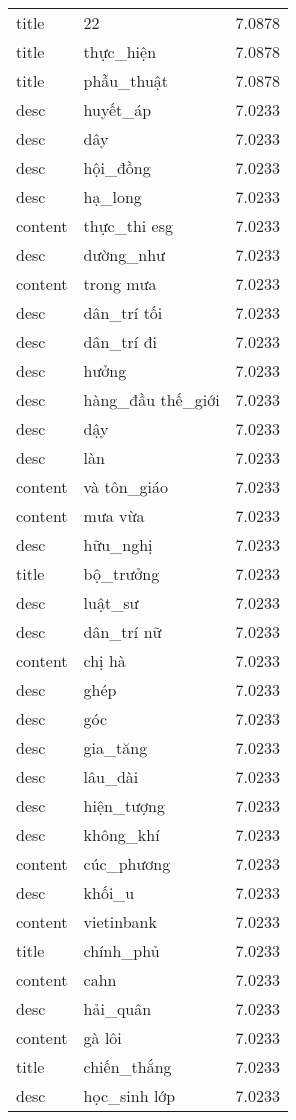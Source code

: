 \documentclass{article}
\begin{document}
\begin{tabular}{lll}
title & 22 & 7.0878\\
title & thực\_hiện & 7.0878\\
title & phẫu\_thuật & 7.0878\\
desc & huyết\_áp & 7.0233\\
desc & dây & 7.0233\\
desc & hội\_đồng & 7.0233\\
desc & hạ\_long & 7.0233\\
content & thực\_thi esg & 7.0233\\
desc & dường\_như & 7.0233\\
content & trong mưa & 7.0233\\
desc & dân\_trí tối & 7.0233\\
desc & dân\_trí đi & 7.0233\\
desc & hưởng & 7.0233\\
desc & hàng\_đầu thế\_giới & 7.0233\\
desc & dậy & 7.0233\\
desc & làn & 7.0233\\
content & và tôn\_giáo & 7.0233\\
content & mưa vừa & 7.0233\\
desc & hữu\_nghị & 7.0233\\
title & bộ\_trưởng & 7.0233\\
desc & luật\_sư & 7.0233\\
desc & dân\_trí nữ & 7.0233\\
content & chị hà & 7.0233\\
desc & ghép & 7.0233\\
desc & góc & 7.0233\\
desc & gia\_tăng & 7.0233\\
desc & lâu\_dài & 7.0233\\
desc & hiện\_tượng & 7.0233\\
desc & không\_khí & 7.0233\\
content & cúc\_phương & 7.0233\\
desc & khối\_u & 7.0233\\
content & vietinbank & 7.0233\\
title & chính\_phủ & 7.0233\\
content & cahn & 7.0233\\
desc & hải\_quân & 7.0233\\
content & gà lôi & 7.0233\\
title & chiến\_thắng & 7.0233\\
desc & học\_sinh lớp & 7.0233\\

\end{tabular}
\end{document}
